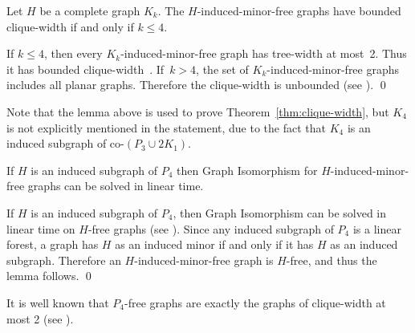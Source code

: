 \documentclass[envcountsame,envcountsect,11pt,a4paper]{llncs}
\renewenvironment{proof}{\begin{Proof}}{\qed\end{Proof}}
\begin{document}
\begin{lemma}
Let $H$ be a complete graph $K_{k}$.
The $H$-induced-minor-free graphs have bounded clique-width if and only if $k \le 4$.
\end{lemma}
\begin{proof}
If $k \le 4$, then every $K_k$-induced-minor-free graph has tree-width at most~2.
Thus it has bounded clique-width~\cite{CR05,CourcelleOlariu2000}.
If~$k>4$, the set of $K_k$-induced-minor-free graphs includes all planar graphs.
Therefore the clique-width is unbounded (see \cite{KaminskiLozinMilanic2009}).
\end{proof}

Note that the lemma above is used to prove Theorem~\ref{thm:clique-width},
but $K_{4}$ is not explicitly mentioned in the statement, due to the fact that $K_{4}$ is an induced subgraph of co-$(P_3 \cup 2K_{1})$.

\begin{lemma}
\label{lem:P4-GI}
If $H$ is an induced subgraph of $P_{4}$
then {\sc Graph Isomorphism} for $H$-induced-minor-free graphs can be solved in linear time.
\end{lemma}
\begin{proof}
If $H$ is an induced subgraph of $P_{4}$,
then {\sc Graph Isomorphism} can be solved in linear time on $H$-free graphs (see {\cite[\S 2.7]{BoothColbourn1979}}).
Since any induced subgraph of $P_{4}$ is a linear forest,
a graph has $H$ as an induced minor if and only if
it has $H$ as an induced subgraph.
Therefore an $H$-induced-minor-free graph is $H$-free, and thus the lemma follows.
\end{proof}

It is well known that $P_{4}$-free graphs
are exactly the graphs of clique-width at most 2 (see \cite{KaminskiLozinMilanic2009}).
\end{document}
